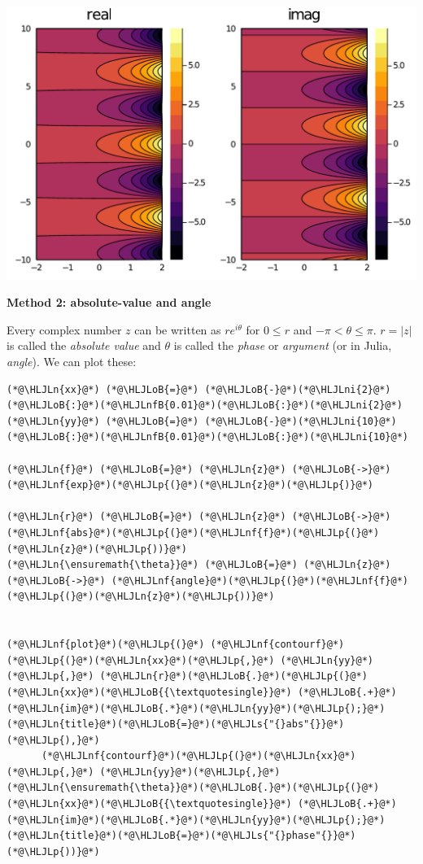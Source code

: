 \documentclass[12pt,a4paper]{article}
\newcommand{\HLJLn}[1]{#1}
\newcommand{\HLJLnf}[1]{\textcolor[RGB]{66,102,213}{#1}}
\newcommand{\HLJLs}[1]{\textcolor[RGB]{201,61,57}{#1}}
\newcommand{\HLJLnfB}[1]{\textcolor[RGB]{59,151,46}{#1}}
\newcommand{\HLJLni}[1]{\textcolor[RGB]{59,151,46}{#1}}
\newcommand{\HLJLoB}[1]{\textcolor[RGB]{102,102,102}{\textbf{#1}}}
\newcommand{\HLJLp}[1]{#1}
\begin{document}
\includegraphics[width=\linewidth]{figures/Lecture1_2_1.pdf}

\textbf{Method 2: absolute-value and angle}

Every complex number $z$ can be written as $re^{i \theta}$ for $0 \leq r$ and $-\pi < \theta \leq \pi$. $r = |z|$ is called the \emph{absolute value} and $\theta$ is called the \emph{phase} or \emph{argument} (or in Julia, \emph{angle}).  We can plot these:


\begin{lstlisting}
(*@\HLJLn{xx}@*) (*@\HLJLoB{=}@*) (*@\HLJLoB{-}@*)(*@\HLJLni{2}@*)(*@\HLJLoB{:}@*)(*@\HLJLnfB{0.01}@*)(*@\HLJLoB{:}@*)(*@\HLJLni{2}@*)
(*@\HLJLn{yy}@*) (*@\HLJLoB{=}@*) (*@\HLJLoB{-}@*)(*@\HLJLni{10}@*)(*@\HLJLoB{:}@*)(*@\HLJLnfB{0.01}@*)(*@\HLJLoB{:}@*)(*@\HLJLni{10}@*)

(*@\HLJLn{f}@*) (*@\HLJLoB{=}@*) (*@\HLJLn{z}@*) (*@\HLJLoB{->}@*) (*@\HLJLnf{exp}@*)(*@\HLJLp{(}@*)(*@\HLJLn{z}@*)(*@\HLJLp{)}@*)

(*@\HLJLn{r}@*) (*@\HLJLoB{=}@*) (*@\HLJLn{z}@*) (*@\HLJLoB{->}@*) (*@\HLJLnf{abs}@*)(*@\HLJLp{(}@*)(*@\HLJLnf{f}@*)(*@\HLJLp{(}@*)(*@\HLJLn{z}@*)(*@\HLJLp{))}@*)
(*@\HLJLn{\ensuremath{\theta}}@*) (*@\HLJLoB{=}@*) (*@\HLJLn{z}@*) (*@\HLJLoB{->}@*) (*@\HLJLnf{angle}@*)(*@\HLJLp{(}@*)(*@\HLJLnf{f}@*)(*@\HLJLp{(}@*)(*@\HLJLn{z}@*)(*@\HLJLp{))}@*)


(*@\HLJLnf{plot}@*)(*@\HLJLp{(}@*) (*@\HLJLnf{contourf}@*)(*@\HLJLp{(}@*)(*@\HLJLn{xx}@*)(*@\HLJLp{,}@*) (*@\HLJLn{yy}@*)(*@\HLJLp{,}@*) (*@\HLJLn{r}@*)(*@\HLJLoB{.}@*)(*@\HLJLp{(}@*)(*@\HLJLn{xx}@*)(*@\HLJLoB{{\textquotesingle}}@*) (*@\HLJLoB{.+}@*) (*@\HLJLn{im}@*)(*@\HLJLoB{.*}@*)(*@\HLJLn{yy}@*)(*@\HLJLp{);}@*) (*@\HLJLn{title}@*)(*@\HLJLoB{=}@*)(*@\HLJLs{"{}abs"{}}@*)(*@\HLJLp{),}@*)
      (*@\HLJLnf{contourf}@*)(*@\HLJLp{(}@*)(*@\HLJLn{xx}@*)(*@\HLJLp{,}@*) (*@\HLJLn{yy}@*)(*@\HLJLp{,}@*) (*@\HLJLn{\ensuremath{\theta}}@*)(*@\HLJLoB{.}@*)(*@\HLJLp{(}@*)(*@\HLJLn{xx}@*)(*@\HLJLoB{{\textquotesingle}}@*) (*@\HLJLoB{.+}@*) (*@\HLJLn{im}@*)(*@\HLJLoB{.*}@*)(*@\HLJLn{yy}@*)(*@\HLJLp{);}@*) (*@\HLJLn{title}@*)(*@\HLJLoB{=}@*)(*@\HLJLs{"{}phase"{}}@*)(*@\HLJLp{))}@*)
\end{lstlisting}
\end{document}
